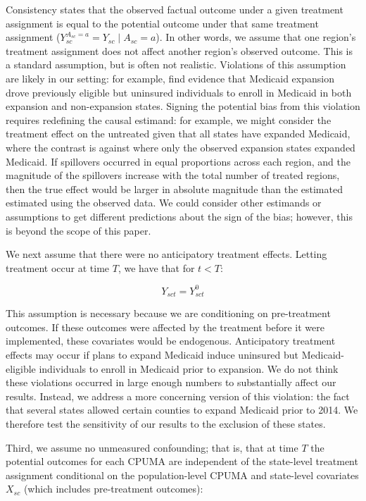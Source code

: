 \documentclass[aoas]{imsart}
\theoremstyle{plain}
\theoremstyle{remark}
\begin{document}
Consistency states that the observed factual outcome under a given treatment assignment is equal to the potential outcome under that same treatment assignment ($Y_{sc}^{A_{sc} = a} = Y_{sc} \mid A_{sc} = a$). In other words, we assume that one region's treatment assignment does not affect another region's observed outcome. This is a standard assumption, but is often not realistic. Violations of this assumption are likely in our setting: for example, \cite{frean2017premium} find evidence that Medicaid expansion drove previously eligible but uninsured individuals to enroll in Medicaid in both expansion and non-expansion states. Signing the potential bias from this violation requires redefining the causal estimand: for example, we might consider the treatment effect on the untreated given that all states have expanded Medicaid, where the contrast is against where only the observed expansion states expanded Medicaid. If spillovers occurred in equal proportions across each region, and the magnitude of the spillovers increase with the total number of treated regions, then the true effect would be larger in absolute magnitude than the estimated estimated using the observed data. We could consider other estimands or assumptions to get different predictions about the sign of the bias; however, this is beyond the scope of this paper.

We next assume that there were no anticipatory treatment effects. Letting treatment occur at time $T$, we have that for $t < T$:

$$
Y_{sct} = Y_{sct}^0
$$

This assumption is necessary because we are conditioning on pre-treatment outcomes. If these outcomes were affected by the treatment before it were implemented, these covariates would be endogenous. Anticipatory treatment effects may occur if plans to expand Medicaid induce uninsured but Medicaid-eligible individuals to enroll in Medicaid prior to expansion. We do not think these violations occurred in large enough numbers to substantially affect our results. Instead, we address a more concerning version of this violation: the fact that several states allowed certain counties to expand Medicaid prior to 2014. We therefore test the sensitivity of our results to the exclusion of these states.

Third, we assume no unmeasured confounding; that is, that at time $T$ the potential outcomes for each CPUMA are independent of the state-level treatment assignment conditional on the population-level CPUMA and state-level covariates $X_{sc}$ (which includes pre-treatment outcomes):
\end{document}

